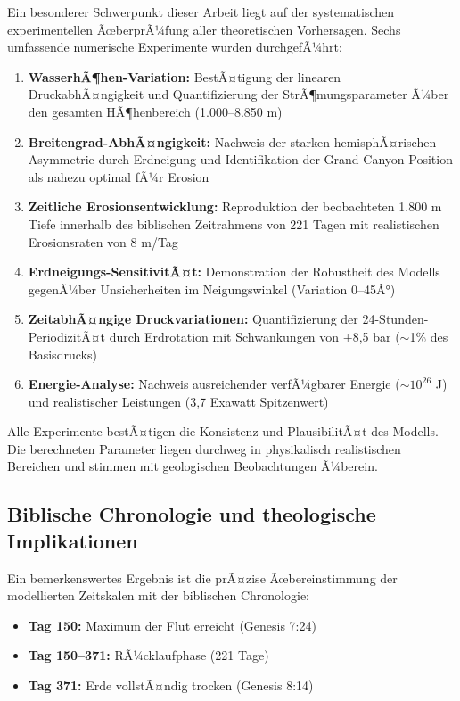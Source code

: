 ﻿\documentclass[12pt,a4paper]{report}
\begin{document}
Ein besonderer Schwerpunkt dieser Arbeit liegt auf der systematischen experimentellen ÃœberprÃ¼fung aller theoretischen Vorhersagen. Sechs umfassende numerische Experimente wurden durchgefÃ¼hrt:

\begin{enumerate}
	\item \textbf{WasserhÃ¶hen-Variation:} BestÃ¤tigung der linearen DruckabhÃ¤ngigkeit und Quantifizierung der StrÃ¶mungsparameter Ã¼ber den gesamten HÃ¶henbereich (1.000--8.850 m)
	
	\item \textbf{Breitengrad-AbhÃ¤ngigkeit:} Nachweis der starken hemisphÃ¤rischen Asymmetrie durch Erdneigung und Identifikation der Grand Canyon Position als nahezu optimal fÃ¼r Erosion
	
	\item \textbf{Zeitliche Erosionsentwicklung:} Reproduktion der beobachteten 1.800 m Tiefe innerhalb des biblischen Zeitrahmens von 221 Tagen mit realistischen Erosionsraten von 8 m/Tag
	
	\item \textbf{Erdneigungs-SensitivitÃ¤t:} Demonstration der Robustheit des Modells gegenÃ¼ber Unsicherheiten im Neigungswinkel (Variation 0--45Â°)
	
	\item \textbf{ZeitabhÃ¤ngige Druckvariationen:} Quantifizierung der 24-Stunden-PeriodizitÃ¤t durch Erdrotation mit Schwankungen von $\pm$8,5 bar ($\sim$1\% des Basisdrucks)
	
	\item \textbf{Energie-Analyse:} Nachweis ausreichender verfÃ¼gbarer Energie ($\sim 10^{26}$ J) und realistischer Leistungen (3,7 Exawatt Spitzenwert)
\end{enumerate}

Alle Experimente bestÃ¤tigen die Konsistenz und PlausibilitÃ¤t des Modells. Die berechneten Parameter liegen durchweg in physikalisch realistischen Bereichen und stimmen mit geologischen Beobachtungen Ã¼berein.

\subsection{Biblische Chronologie und theologische Implikationen}

Ein bemerkenswertes Ergebnis ist die prÃ¤zise Ãœbereinstimmung der modellierten Zeitskalen mit der biblischen Chronologie:

\begin{itemize}
	\item \textbf{Tag 150:} Maximum der Flut erreicht (Genesis 7:24)
	\item \textbf{Tag 150--371:} RÃ¼cklaufphase (221 Tage)
	\item \textbf{Tag 371:} Erde vollstÃ¤ndig trocken (Genesis 8:14)
\end{itemize}
\end{document}
